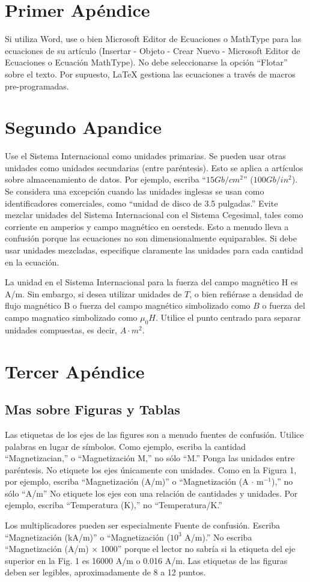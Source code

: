 \documentclass[final,5p,times,twocolumn,authoryear,10pt]{elsarticle}
\begin{document}
\appendix
\section{Primer Apéndice}    %
Si utiliza Word, use o bien Microsoft Editor de Ecuaciones o  MathType  para las ecuaciones de su artículo (Insertar - Objeto - Crear Nuevo - Microsoft Editor de Ecuaciones o Ecuación MathType). No debe seleccionarse la opción “Flotar” sobre el texto. Por supuesto, LaTeX gestiona las ecuaciones a través de macros pre-programadas.

\section{Segundo Apandice}
Use el Sistema Internacional como unidades primarias. Se pueden usar otras unidades como unidades secundarias (entre paréntesis). Esto se aplica a artículos sobre almacenamiento de datos. Por ejemplo, escriba ``$15 Gb/cm^2$'' ($100 Gb/in^2$). Se considera una excepción cuando las unidades inglesas se usan como identificadores comerciales, como “unidad de disco de 3.5 pulgadas.” Evite mezclar unidades del Sistema Internacional con el Sistema Cegesimal, tales como corriente en amperios y campo magnético en oersteds. Esto a menudo lleva a confusión porque las ecuaciones no son dimensionalmente equiparables. Si debe usar unidades mezcladas, especifique claramente las unidades para cada cantidad en la ecuación.

La unidad en el Sistema Internacional para la fuerza del campo magnético H es A/m. Sin embargo, si desea utilizar unidades de $T$, o bien refiérase a densidad de flujo magnético B o fuerza del campo magnético simbolizado como $B$ o fuerza del campo magnatico simbolizado como $\mu_0 H$. Utilice el punto centrado para separar unidades compuestas, es decir, $A\cdot m^2$.

\section{Tercer Apéndice}

\subsection{Mas sobre Figuras y Tablas}

Las etiquetas de los ejes de las figures son a menudo fuentes de confusión. Utilice palabras en lugar de símbolos. Como ejemplo, escriba la cantidad ``Magnetizacian,'' o ``Magnetización M,'' no sólo ``M.'' Ponga las unidades entre paréntesis. No etiquete los ejes únicamente con unidades. Como en la Figura 1, por ejemplo, escriba ``Magnetización (A/m)'' o ``Magnetización (A $\cdot$ m$^{-1}$),'' no sólo ``A/m'' No etiquete los ejes con una relación de cantidades y unidades. Por ejemplo, escriba ``Temperatura (K),''
no ``Temperatura/K.''

Los multiplicadores pueden ser especialmente Fuente de confusión. Escriba ``Magnetización (kA/m)'' o ``Magnetización ($10^3$ A/m).'' No escriba ``Magnetización (A/m) $\times$ 1000'' porque el lector no sabría si la etiqueta del eje superior en la Fig. 1 es 16000 A/m o 0.016 A/m. Las etiquetas de las figuras deben ser legibles, aproximadamente de 8 a 12 puntos.
\end{document}
